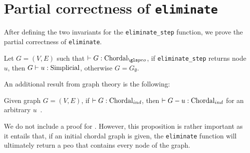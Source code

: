 \section{Partial correctness of \texttt{eliminate}}

After defining the two invariants for the \texttt{eliminate\_step} function, we prove the partial correctness of \texttt{eliminate}.

\begin{theorem}\label{thm:par-cor}
    Let $G = (V, E)$ such that $\chordalpeo{G}$, if \texttt{eliminate\_step} returns node $u$, then $\simplicial{u}{G}$, otherwise $G = G_\emptyset$. \Coqed
\end{theorem}

An additional result from graph theory is the following:

\begin{theorem}\label{thm:cho-inv}
    Given graph $G = (V, E)$, if $\chordalind{G}$, then $\chordalind{G - u}$ for an arbitrary $u$~\cite{golumbic2004algorithmic}.
\end{theorem}

We do not include a proof for . However, this proposition is rather important as it entails that, if an initial chordal graph is given, the \texttt{eliminate} function will ultimately return a \gls{peo} that contains every node of the graph.